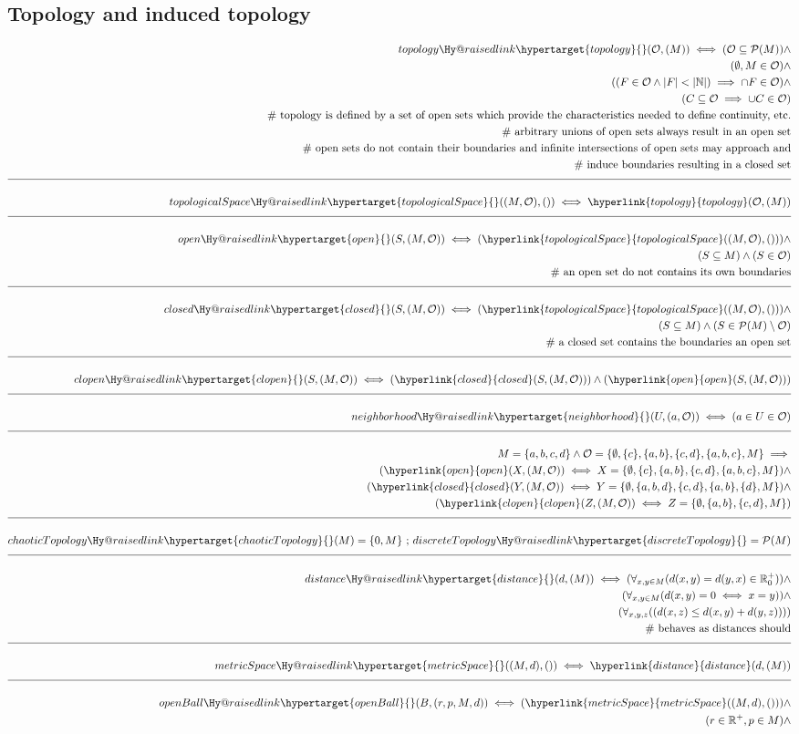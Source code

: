 \documentclass[a4paper]{article}
\makeatletter
\newcommand{\eqComment}[1]{\text{  \# #1}}
\newcommand{\eqSep}{\text{ ;  }}
\newcommand{\n}{\\[1.5ex] \hline \nonumber \\[0ex]}
\newcommand{\m}{\nonumber \\}
\newcommand{\labeltarget}[1]{\Hy@raisedlink{\hypertarget{#1}{}}}
\newcommand{\dfn}[1]{#1\labeltarget{#1}}
\newcommand{\rfr}[1]{\hyperlink{#1}{#1}}
\makeatother
\begin{document}
\subsection{Topology and induced topology}
\begin{tcolorbox}
\begin{align}
   \dfn{topology}(\mathcal{O}, (M)) \iff (\mathcal{O} \subseteq \mathcal{P}(M)) \land
\m (\emptyset, M \in \mathcal{O}) \land
\m ((F \in \mathcal{O} \land |F| < |\mathbb{N}|) \implies \cap F \in \mathcal{O}) \land
\m  (C \subseteq \mathcal{O} \implies \cup C \in \mathcal{O})
\m \eqComment{topology is defined by a set of open sets which provide the characteristics needed to define continuity, etc.}
\m \eqComment{arbitrary unions of open sets always result in an open set}
\m \eqComment{open sets do not contain their boundaries and infinite intersections of open sets may approach and}
\m \eqComment{induce boundaries resulting in a closed set}
\n \dfn{topologicalSpace}((M, \mathcal{O}), ()) \iff \rfr{topology}(\mathcal{O}, (M))
\n \dfn{open}(S, (M, \mathcal{O})) \iff (\rfr{topologicalSpace}((M, \mathcal{O}), ())) \land
\m (S \subseteq M) \land (S \in \mathcal{O})
\m \eqComment{an open set do not contains its own boundaries}
\n \dfn{closed}(S, (M, \mathcal{O})) \iff (\rfr{topologicalSpace}((M, \mathcal{O}), ())) \land
\m (S \subseteq M) \land (S \in \mathcal{P}(M) \setminus \mathcal{O})
\m \eqComment{a closed set contains the boundaries an open set}
\n \dfn{clopen}(S, (M, \mathcal{O})) \iff (\rfr{closed}(S, (M, \mathcal{O}))) \land (\rfr{open}(S, (M, \mathcal{O})))
\n \dfn{neighborhood}(U, (a, \mathcal{O})) \iff (a \in U \in \mathcal{O})
\n M = \{a, b, c, d\} \land \mathcal{O} = \{\emptyset, \{c\}, \{a, b\}, \{c, d\}, \{a, b, c\}, M\} \implies
\m (\rfr{open}(X, (M, \mathcal{O})) \iff X = \{\emptyset, \{c\}, \{a, b\}, \{c, d\}, \{a, b, c\}, M\}) \land
\m (\rfr{closed}(Y, (M, \mathcal{O})) \iff Y = \{\emptyset, \{a, b, d\}, \{c, d\}, \{a, b\}, \{d\}, M\}) \land
\m (\rfr{clopen}(Z, (M, \mathcal{O})) \iff Z = \{\emptyset, \{a, b\}, \{c, d\}, M\})	
\n \dfn{chaoticTopology}(M) = \{0, M\} \eqSep \dfn{discreteTopology} = \mathcal{P}(M)
\n \dfn{distance}(d, (M)) \iff (\forall_{x, y \in M} (d(x, y) = d(y, x) \in \mathbb{R}^+_0)) \land
\m (\forall_{x, y \in M} (d(x, y) = 0 \iff x = y)) \land
\m (\forall_{x, y, z} ((d(x, z) \leq d(x, y) + d(y, z))))
\m \eqComment{behaves as distances should}
\n \dfn{metricSpace}((M, d), ()) \iff \rfr{distance}(d, (M))
\n \dfn{openBall}(B, (r, p, M, d)) \iff (\rfr{metricSpace}((M, d), ())) \land
\m (r \in \mathbb{R}^+, p \in M) \land

\end{align}
\end{tcolorbox}
\end{document}
